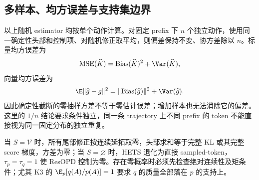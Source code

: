 \subsection{多样本、均方误差与支持集边界}

以上随机 estimator 均按单个动作计算。对固定 prefix 下 $n$ 个独立动作，使用同一确定性头部和控制项、对随机修正取平均，则偏差保持不变、协方差除以 $n$。标量均方误差为
\[
 \operatorname{MSE}(\widehat K)=\operatorname{Bias}(\widehat K)^2+\Var(\widehat K),
\]
向量均方误差为
\[
 \E\lVert\widehat g-g\rVert^2
 =\lVert\operatorname{Bias}(\widehat g)\rVert^2+\Var(\widehat g).
\]
因此确定性截断的零抽样方差不等于零估计误差；增加样本也无法消除它的偏差。这里的 $1/n$ 结论要求条件独立，同一条 trajectory 上不同 prefix 的 token 不能直接视为同一固定分布的独立重复。

当 $S=\mathcal V$ 时，所有尾部修正按连续延拓取零，头部求和等于完整 KL 或其完整 score 梯度，方差为零；当 $S=\varnothing$ 时，HETS 退化为直接 sampled-token，$\tau_p=\tau_q=1$ 使 ResOPD 控制为零。存在零概率时必须先检查绝对连续性及矩条件；尤其 K3 的 $\E_p[q(A)/p(A)]=1$ 要求 $q$ 的质量全部落在 $p$ 的支持上。
